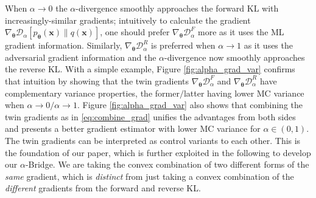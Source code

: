 \documentclass[letterpaper]{article} %
\newcommand{\Dc}[0]{\ensuremath{\mathcal{D}} }
\newcommand{\xv}[0]{\ensuremath{\boldsymbol{x}} }
\newcommand{\thetav}[0]{\ensuremath{\boldsymbol{\theta}} }
\begin{document}
When $\alpha\rightarrow0$ the $\alpha$-divergence smoothly approaches the forward KL with increasingly-similar gradients; intuitively to calculate the gradient $\nabla_{\thetav} \Dc_{\alpha} [p_{\thetav}(\xv) \| q(\xv)]$, one should prefer $\nabla_{\thetav} \Dc_{\alpha}^F$ more as it uses the ML gradient information. 
Similarly, $\nabla_{\thetav} \Dc_{\alpha}^R$ is preferred when $\alpha \rightarrow 1$ as it uses the adversarial gradient information and the $\alpha$-divergence now smoothly approaches the reverse KL.
With a simple example, Figure \ref{fig:alpha_grad_var} confirms that intuition by showing that the twin gradients $\nabla_{\thetav} \Dc_{\alpha}^F$ and $\nabla_{\thetav} \Dc_{\alpha}^R$ have complementary variance properties, the former$/$latter having lower MC variance when $\alpha \rightarrow 0 / \alpha \rightarrow 1$.
Figure \ref{fig:alpha_grad_var} also shows that combining the twin gradients as in \eqref{eq:combine_grad} unifies the advantages from both sides and presents a better gradient estimator with lower MC variance for $\alpha \in (0, 1)$. 
The twin gradients can be interpreted as control variants to each other. 
This is the foundation of our paper, which is further exploited in the following to develop our $\alpha$-Bridge. We are taking the convex combination of two different forms of the {\em same} gradient, which is {\em distinct} from just taking a convex combination of the {\em different} gradients from the forward and reverse KL. 
\end{document}
